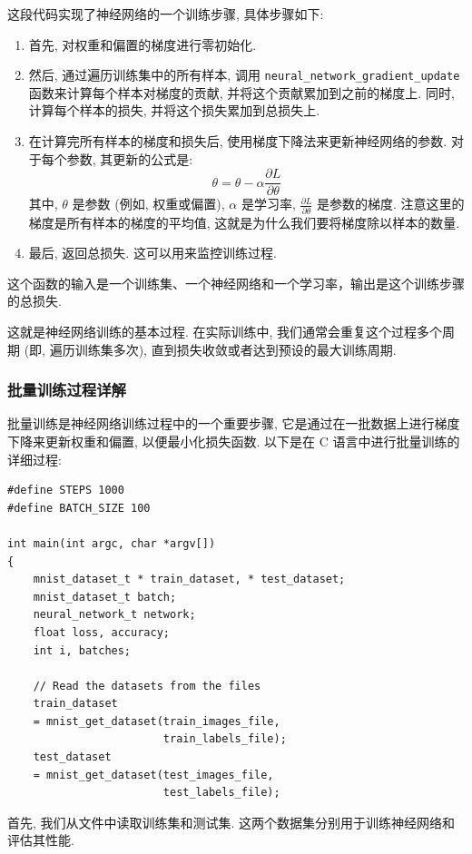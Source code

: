 \documentclass{ctexart}
\begin{document}
这段代码实现了神经网络的一个训练步骤, 具体步骤如下:
\begin{enumerate}
    \item 首先, 对权重和偏置的梯度进行零初始化.
    \item 然后, 通过遍历训练集中的所有样本, 调用
          \verb|neural_network_gradient_update| 函数来计算每个样本对梯度的贡献,
          并将这个贡献累加到之前的梯度上. 同时, 计算每个样本的损失, 并将这个损失累加到总损失上.
    \item 在计算完所有样本的梯度和损失后, 使用梯度下降法来更新神经网络的参数. 对于每个参数, 其更新的公式是:
          $$
              \theta = \theta - \alpha \frac{\partial L}{\partial \theta}
          $$
          其中, $\theta$ 是参数 (例如, 权重或偏置), $\alpha$ 是学习率,
          $\frac{\partial L}{\partial \theta}$ 是参数的梯度. 注意这里的梯度是所有样本的梯度的平均值, 这就是为什么我们要将梯度除以样本的数量.
    \item 最后, 返回总损失. 这可以用来监控训练过程.
\end{enumerate}

这个函数的输入是一个训练集、一个神经网络和一个学习率，输出是这个训练步骤的总损失.

这就是神经网络训练的基本过程. 在实际训练中, 我们通常会重复这个过程多个周期 (即, 遍历训练集多次), 直到损失收敛或者达到预设的最大训练周期.

\subsubsection{批量训练过程详解}

批量训练是神经网络训练过程中的一个重要步骤, 它是通过在一批数据上进行梯度下降来更新权重和偏置, 以便最小化损失函数.
以下是在 C 语言中进行批量训练的详细过程:

\begin{verbatim}  
#define STEPS 1000  
#define BATCH_SIZE 100  
  
int main(int argc, char *argv[])  
{  
    mnist_dataset_t * train_dataset, * test_dataset;  
    mnist_dataset_t batch;  
    neural_network_t network;  
    float loss, accuracy;  
    int i, batches;  
  
    // Read the datasets from the files  
    train_dataset 
    = mnist_get_dataset(train_images_file, 
                        train_labels_file);  
    test_dataset 
    = mnist_get_dataset(test_images_file, 
                        test_labels_file);  
\end{verbatim}

首先, 我们从文件中读取训练集和测试集. 这两个数据集分别用于训练神经网络和评估其性能.
\end{document}
